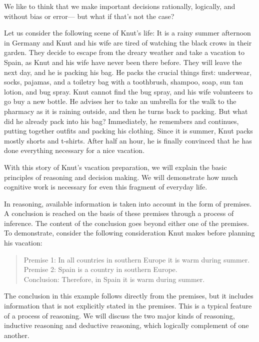 \documentclass[
]{krantz}
\begin{document}
We like to think that we make important decisions rationally, logically, and without bias or error--- but what if that's not the case?

Let us consider the following scene of Knut's life: It is a rainy summer afternoon in Germany and Knut and his wife are tired of watching the black crows in their garden. They decide to escape from the dreary weather and take a vacation to Spain, as Knut and his wife have never been there before. They will leave the next day, and he is packing his bag. He packs the crucial things first: underwear, socks, pajamas, and a toiletry bag with a toothbrush, shampoo, soap, sun tan lotion, and bug spray. Knut cannot find the bug spray, and his wife volunteers to go buy a new bottle. He advises her to take an umbrella for the walk to the pharmacy as it is raining outside, and then he turns back to packing. But what did he already pack into his bag? Immediately, he remembers and continues, putting together outfits and packing his clothing. Since it is summer, Knut packs mostly shorts and t-shirts. After half an hour, he is finally convinced that he has done everything necessary for a nice vacation.

With this story of Knut's vacation preparation, we will explain the basic principles of reasoning and decision making. We will demonstrate how much cognitive work is necessary for even this fragment of everyday life.

In reasoning, available information is taken into account in the form of premises. A conclusion is reached on the basis of these premises through a process of inference. The content of the conclusion goes beyond either one of the premises. To demonstrate, consider the following consideration Knut makes before planning his vacation:

\begin{quote}
Premise 1: In all countries in southern Europe it is warm during summer.\\
Premise 2: Spain is a country in southern Europe.\\
Conclusion: Therefore, in Spain it is warm during summer.
\end{quote}

The conclusion in this example follows directly from the premises, but it includes information that is not explicitly stated in the premises. This is a typical feature of a process of reasoning. We will discuss the two major kinds of reasoning, inductive reasoning and deductive reasoning, which logically complement of one another.
\end{document}
